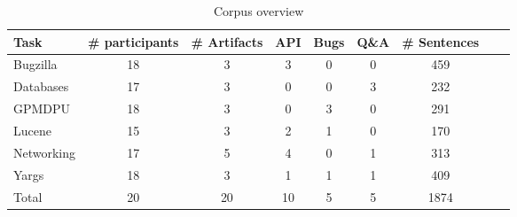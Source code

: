 
\begin{table}
\caption{Corpus overview}
\begin{footnotesize}
\begin{center}
\begin{tabular}{l|cccccccc}
\hline    
\textbf{Task} 
&  \textbf{\# participants}
&   \textbf{\# Artifacts} 
&   \textbf{API} 
&   \textbf{Bugs} 
&   \textbf{Q\&A} 
&  \textbf{\# Sentences} \\ 
\hline    
\hline
Bugzilla    & 18 & 3 & 3 & 0 & 0 & 459 \\
Databases   & 17 & 3 & 0 & 0 & 3 & 232 \\
GPMDPU      & 18 & 3 & 0 & 3 & 0 & 291 \\
Lucene      & 15 & 3 & 2 & 1 & 0 & 170 \\     
Networking  & 17 & 5 & 4 & 0 & 1 & 313 \\
Yargs       & 18 & 3 & 1 & 1 & 1 & 409 \\
\hline    
\hline 
\rowcolor{white}
Total       & 20 & 20 & 10 & 5 & 5 & 1874  \\
\hline 
\end{tabular}
\end{center}
\end{footnotesize}
\label{tbl:corpus-stats}
\end{table}
